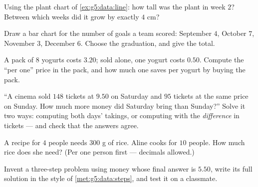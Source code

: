 \begin{exercise}[$\star$]\label{exo:g5:data:6}
Using the plant chart of \cref{ex:g5:data:line}: how tall was the
plant in week $2$? Between which weeks did it grow by exactly
$4$ cm?
\end{exercise}

\begin{exercise}[$\star$]\label{exo:g5:data:7}
Draw a bar chart for the number of goals a team scored:
September $4$, October $7$, November $3$, December $6$. Choose the
graduation, and give the total.
\end{exercise}

\begin{exercise}[$\star$]\label{exo:g5:data:8}
A pack of $8$ yogurts costs $3.20$; sold alone, one yogurt costs
$0.50$. Compute the ``per one'' price in the pack, and how much one
saves per yogurt by buying the pack.
\end{exercise}

\begin{exercise}[$\star\star$]\label{exo:g5:data:9}
``A cinema sold $148$ tickets at $9.50$ on Saturday and $95$ tickets
at the same price on Sunday. How much more money did Saturday bring
than Sunday?'' Solve it two ways: computing both days' takings, or
computing with the \emph{difference} in tickets --- and check that
the answers agree.
\end{exercise}

\begin{exercise}[$\star\star$]\label{exo:g5:data:10}
A recipe for $4$ people needs $300$ g of rice. Aline cooks for
$10$ people. How much rice does she need? (Per one person first ---
decimals allowed.)
\end{exercise}

\begin{exercise}[$\star\star$]\label{exo:g5:data:11}
Invent a three-step problem using money whose final answer is
$5.50$, write its full solution in the style of
\cref{met:g5:data:steps}, and test it on a classmate.
\end{exercise}
